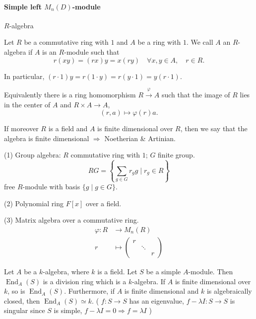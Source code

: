 \documentclass[11pt, a4paper]{report}
\begin{document}
\paragraph{Simple left $M_n(D)$-module}

\begin{definition}
$R$-algebra

Let $R$ be a commutative ring with $1$ and $A$ be a ring with $1$. We call $A$ an $R$-algebra if $A$ is an $R$-module such that
\[
r(xy) = (rx)y = x(ry) \quad \forall x, y \in A, \quad r \in R.
\]

In particular, $(r \cdot 1)y = r(1 \cdot y) = r(y \cdot 1) = y(r \cdot 1)$.

Equivalently there is a ring homomorphism $R \xrightarrow{\varphi} A$ such that the image of $R$ lies in the center of $A$ and $R \times A \rightarrow A$,
\[
(r, a) \mapsto \varphi(r)a.
\]

If moreover $R$ is a field and $A$ is finite dimensional over $R$, then we say that the algebra is finite dimensional $\Rightarrow$ Noetherian \& Artinian.

\end{definition}

\begin{example}
(1) Group algebra: $R$ commutative ring with $1$; $G$ finite group.
\[
RG = \left\{\sum_{g \in G} r_g g \mid r_g \in R\right\}
\]
free $R$-module with basis $\{g \mid g \in G\}$.

(2) Polynomial ring $F[x]$ over a field.

(3) Matrix algebra over a commutative ring.
\[
\begin{aligned}
\varphi: R &\rightarrow M_n(R) \\
r &\mapsto \begin{pmatrix} r & & \\ & \ddots & \\ & & r \end{pmatrix}
\end{aligned}
\]

Let $A$ be a $k$-algebra, where $k$ is a field. Let $S$ be a simple $A$-module. Then $\operatorname{End}_A(S)$ is a division ring which is a $k$-algebra. If $A$ is finite dimensional over $k$, so is $\operatorname{End}_A(S)$. Furthermore, if $A$ is finite dimensional and $k$ is algebraically closed, then $\operatorname{End}_A(S) \simeq k$. ( $f: S \rightarrow S$ has an eigenvalue, $f - \lambda I: S \rightarrow S$ is singular since $S$ is simple, $f - \lambda I = 0 \Rightarrow f = \lambda I$ )
\end{example}
\end{document}
